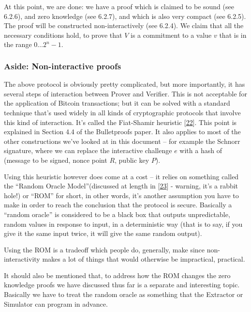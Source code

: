 \documentclass[10pt,a4paper]{article}
\begin{document}
At this point, we are done: we have a proof which is claimed to be sound
(see 6.2.6), and zero knowledge (see 6.2.7), and which is also very
compact (see 6.2.5). The proof will be constructed non-interactively
(see 6.2.4). We claim that all the necessary conditions hold, to prove
that $V$ is a commitment to a value $v$ that is in the range $0\ldots 2^n -1$.

\hypertarget{aside-non-interactive-proofs}{%
\subsubsection[Aside: Non-interactive
proofs]{\texorpdfstring{\protect\hypertarget{anchor-58}{}{}Aside:
Non-interactive
proofs}{Aside: Non-interactive proofs}}\label{aside-non-interactive-proofs}}

The above protocol is obviously pretty complicated, but more
importantly, it has several steps of interaction between Prover and
Verifier. This is not acceptable for the application of Bitcoin
transactions; but it can be solved with a standard technique that's used
widely in all kinds of cryptographic protocols that involve this kind of
interaction. It's called the Fiat-Shamir heuristic
{[}\protect\hyperlink{anchor-59}{22}{]}. This point is explained in
Section 4.4 of the Bulletproofs paper. It also applies to most of the
other constructions we've looked at in this document -- for example the
Schnorr signature, where we can replace the interactive challenge $e$ with
a hash of (message to be signed, nonce point $R$, public key $P$).

Using this heuristic however does come at a cost -- it relies on
something called the ``Random Oracle Model''(discussed at length in
{[}\protect\hyperlink{anchor-60}{23}{]} - warning, it's a rabbit hole!)
or ``ROM'' for short, in other words, it's another assumption you have
to make in order to reach the conclusion that the protocol is secure.
Basically a ``random oracle'' is considered to be a black box that
outputs unpredictable, random values in response to input, in a
deterministic way (that is to say, if you give it the same input twice,
it will give the same random output).

Using the ROM is a tradeoff which people do, generally, make since
non-interactivity makes a lot of things that would otherwise be
impractical, practical.

It should also be mentioned that, to address how the ROM changes the
zero knowledge proofs we have discussed thus far is a separate and
interesting topic. Basically we have to treat the random oracle as
something that the Extractor or Simulator can program in advance.
\end{document}
